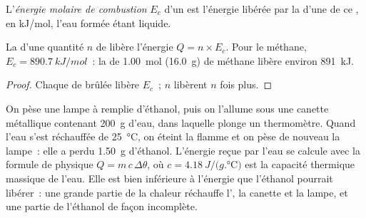 \begin{definition}\label{def:g11:reaction-energy:combustion-energy}
L'\emph{énergie molaire de combustion}
$E_c$ d'un  est l'énergie libérée par la 
d'une  de ce , en \si{kJ/mol}, l'eau formée étant
liquide.
\end{definition}

\begin{proposition}\label{prop:g11:reaction-energy:n-moles}
La  d'une quantité $n$ de  libère
l'énergie $Q = n \times E_c$. Pour le méthane,
$E_c = \qty{890.7}{kJ/mol}$~: la  de \qty{1.00}{mol}
(\qty{16.0}{g}) de méthane libère environ \qty{891}{kJ}.
\end{proposition}

\begin{proof}
Chaque  de  brûlée libère $E_c$~; $n$  libèrent
$n$ fois plus.
\end{proof}

\begin{inthelab}
On pèse une lampe à  remplie d'éthanol, puis on l'allume sous une
canette métallique contenant \qty{200}{g} d'eau, dans laquelle plonge un
thermomètre. Quand l'eau s'est réchauffée de \qty{25}{\celsius}, on
éteint la flamme et on pèse de nouveau la lampe~: elle a perdu
\qty{1.50}{g} d'éthanol. L'énergie reçue par l'eau se calcule avec la
formule de physique $Q = m\, c\, \Delta\theta$,
où $c = \qty{4.18}{J/(g.\celsius)}$ est la capacité thermique massique
de l'eau. Elle est bien inférieure à l'énergie que l'éthanol pourrait
libérer~: une grande partie de la chaleur réchauffe l', la canette et
la lampe, et une partie de l'éthanol  de façon incomplète.
\end{inthelab}

